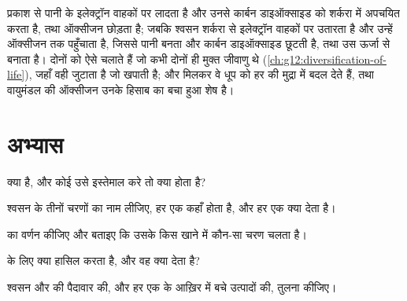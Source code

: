 \begin{remark}[प्रकाशसंश्लेषण का दर्पण]\label{rem:g12:respiration-fermentation:mirror}
 प्रकाश से पानी के इलेक्ट्रॉन वाहकों पर लादता है और उनसे
कार्बन डाइऑक्साइड को शर्करा में अपचयित करता है, तथा ऑक्सीजन छोड़ता है;
जबकि श्वसन शर्करा से इलेक्ट्रॉन वाहकों पर उतारता है और उन्हें ऑक्सीजन तक
पहुँचाता है, जिससे पानी बनता और कार्बन डाइऑक्साइड छूटती है, तथा उस ऊर्जा
से  बनाता है। दोनों को ऐसे  चलाते हैं जो कभी दोनों ही मुक्त
जीवाणु थे (\cref{ch:g12:diversification-of-life}), जहाँ  वही जुटाता
है जो  खपाती है; और मिलकर वे धूप को हर  की मुद्रा में बदल
देते हैं, तथा वायुमंडल की ऑक्सीजन उनके हिसाब का बचा हुआ शेष है।
\end{remark}

\section{अभ्यास}

\begin{exercise}[$\star$]\label{exo:g12:respiration-fermentation:1}
 क्या है, और कोई  उसे इस्तेमाल करे तो क्या होता है?
\end{exercise}

\begin{exercise}[$\star$]\label{exo:g12:respiration-fermentation:2}
श्वसन के तीनों चरणों का नाम लीजिए, हर एक कहाँ होता है, और हर एक क्या देता
है।
\end{exercise}

\begin{exercise}[$\star$]\label{exo:g12:respiration-fermentation:3}
 का वर्णन कीजिए और बताइए कि उसके किस खाने में कौन-सा चरण चलता है।
\end{exercise}

\begin{exercise}[$\star$]\label{exo:g12:respiration-fermentation:4}
  के लिए क्या हासिल करता है, और वह क्या देता है?
\end{exercise}

\begin{exercise}[$\star$]\label{exo:g12:respiration-fermentation:5}
श्वसन और  की  पैदावार की, और हर एक के आख़िर में बचे उत्पादों की,
तुलना कीजिए।
\end{exercise}

